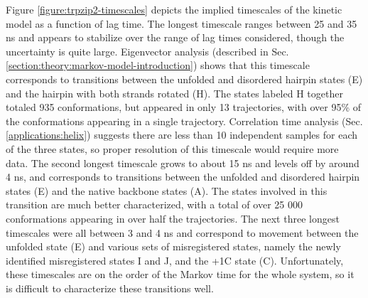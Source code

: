 Figure \ref{figure:trpzip2-timescales} depicts the implied timescales of the kinetic model as a function of lag time.
The longest timescale ranges between 25 and 35 ns and appears to stabilize over the range of lag times considered, though the uncertainty is quite large.
Eigenvector analysis (described in Sec. \ref{section:theory:markov-model-introduction}) shows that this timescale corresponds to transitions between the unfolded and disordered hairpin states (E) and the hairpin with both strands rotated (H).
The states labeled H together totaled 935 conformations, but appeared in only 13 trajectories, with over 95\% of the conformations appearing in a single trajectory.
Correlation time analysis (Sec. \ref{applications:helix}) suggests there are less than 10 independent samples for each of the three states, so proper resolution of this timescale would require more data.
The second longest timescale grows to about 15 ns and levels off by around 4 ns, and corresponds to transitions between the unfolded and disordered hairpin states (E) and the 
native backbone states (A).
The states involved in this transition are much better characterized, with a total of over 25 000 conformations appearing in over half the trajectories.
The next three longest timescales were all between 3 and 4 ns and correspond to movement between the unfolded state (E) and various sets of misregistered states, namely
the newly identified misregistered states I and J, and the +1C state (C).
Unfortunately, these timescales are on the order of the Markov time for the whole system, so it is difficult to characterize these transitions well.

